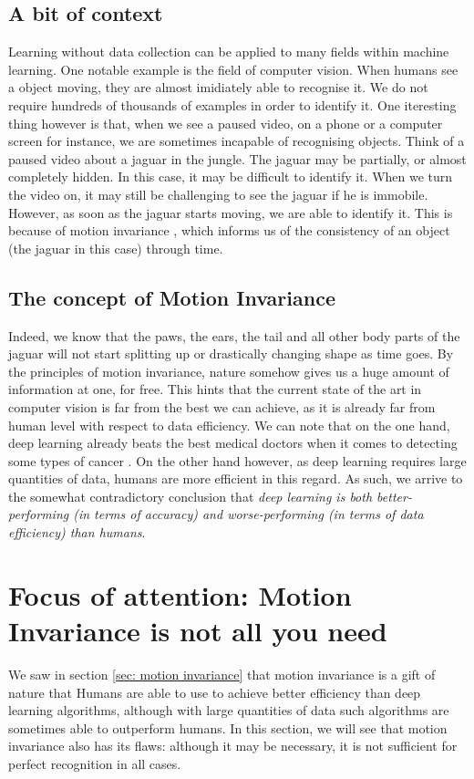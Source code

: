\documentclass[12pt]{article}
\begin{document}
\subsection{A bit of context}
Learning without data collection can be applied to many fields within machine learning. One notable example is the field of computer vision. When humans see a object moving, they are almost imidiately able to recognise it. We do not require hundreds of thousands of examples in order to identify it. One iteresting thing however is that, when we see a paused video, on a phone or a computer screen for instance, we are sometimes incapable of recognising objects. Think of a paused video about a jaguar in the jungle. The jaguar may be partially, or almost completely hidden. In this case, it may be difficult to identify it. When we turn the video on, it may still be challenging to see the jaguar if he is immobile. However, as soon as the jaguar starts moving, we are able to identify it. This is because of motion invariance \cite{gori2022}, which informs us of the consistency of an object (the jaguar in this case) through time.

\subsection{The concept of Motion Invariance}
Indeed, we know that the paws, the ears, the tail and all other body parts of the jaguar will not start splitting up or drastically changing shape as time goes. By the principles of motion invariance, nature somehow gives us a huge amount of information at one, for free. This hints that the current state of the art in computer vision is far from the best we can achieve, as it is already far from human level with respect to data efficiency. We can note that on the one hand, deep learning already beats the best medical doctors when it comes to detecting some types of cancer \cite{shen2019}. On the other hand however, as deep learning requires large quantities of data, humans are more efficient in this regard. As such, we arrive to the somewhat contradictory conclusion that \textit{deep learning is both better-performing (in terms of accuracy) and worse-performing (in terms of data efficiency) than humans}.

\section{Focus of attention: Motion Invariance is not all you need}
We saw in section \ref{sec: motion invariance} that motion invariance is a gift of nature that Humans are able to use to achieve better efficiency than deep learning algorithms, although with large quantities of data such algorithms are sometimes able to outperform humans. In this section, we will see that motion invariance also has its flaws: although it may be necessary, it is not sufficient for perfect recognition in all cases.
\end{document}
